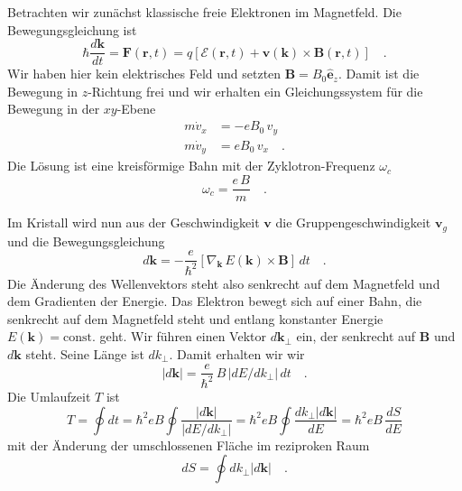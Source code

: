 Betrachten wir zunächst klassische freie Elektronen im Magnetfeld. Die Bewegungsgleichung ist 
\begin{equation}
   \hbar \frac{d \mathbf{k}}{dt} = \mathbf{F}(\mathbf{r}, t) = q \left[ \bm{\mathcal{E}}(\mathbf{r}, t) +   \mathbf{v}(\mathbf{k}) \times \mathbf{B}(\mathbf{r}, t)\right]  \quad .
\end{equation}
Wir haben hier kein elektrisches Feld und setzten $\mathbf{B} = B_0 \hat{\mathbf{e}}_z$. Damit ist die Bewegung in $z$-Richtung frei und wir erhalten ein Gleichungssystem für die Bewegung in der $xy$-Ebene
\begin{eqnarray}
   m \dot{v}_x & = -e B_0 \, v_y \\
   m \dot{v}_y & = e B_0 \, v_x  \quad .
\end{eqnarray}
Die Lösung ist eine kreisförmige Bahn mit der Zyklotron-Frequenz $\omega_c$
\begin{equation}
   \omega_c = \frac{e \, B }{m} \quad .
\end{equation}

Im Kristall wird nun aus der Geschwindigkeit $\mathbf{v}$ die Gruppengeschwindigkeit $\mathbf{v}_g$ und die Bewegungsgleichung
\begin{equation}
   d\mathbf{k} = - \frac{e}{\hbar^2} \left[ \nabla_\mathbf{k}\, E(\mathbf{k}) \times \mathbf{B} \right] \, dt  \quad .
\end{equation}
Die Änderung des Wellenvektors steht also senkrecht auf dem Magnetfeld und dem Gradienten der Energie. Das Elektron bewegt sich auf einer Bahn, die senkrecht auf dem Magnetfeld steht und entlang konstanter Energie $E(\mathbf{k}) = \text{const.}$ geht. Wir führen einen Vektor $d\mathbf{k}_\perp$ ein, der senkrecht auf $\mathbf{B}$ und  $d\mathbf{k}$ steht. Seine Länge ist $dk_\perp$. Damit erhalten wir wir 
\begin{equation}
   |d\mathbf{k}|  =  \frac{e}{\hbar^2} \, B \, |d E /dk_\perp | \, dt  \quad .
\end{equation}
Die Umlaufzeit $T$ ist
\begin{equation}
   T = \oint dt =  {\hbar^2}{e B } \oint \frac{ |d\mathbf{k}|  }{|d E /dk_\perp |}
   =  {\hbar^2}{e B } \oint \frac{dk_\perp  |d\mathbf{k}| }{d E } 
   = {\hbar^2}{e B } \, \frac{dS}{dE} \label{eq:4_t_zykl}
\end{equation}
mit der Änderung der umschlossenen Fläche im reziproken Raum 
\begin{equation}
   dS = \oint dk_\perp  |d\mathbf{k}|  \quad .
\end{equation}



